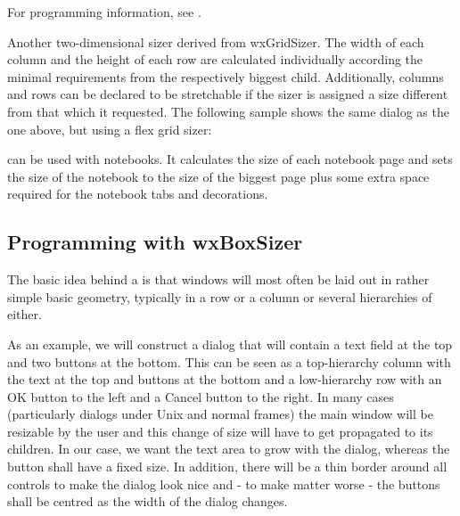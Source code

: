 For programming information, see .


Another two-dimensional sizer derived from
wxGridSizer. The width of each column and the height of each row
are calculated individually according the minimal requirements
from the respectively biggest child. Additionally, columns and
rows can be declared to be stretchable if the sizer is assigned
a size different from that which it requested. The following sample shows
the same dialog as the one above, but using a flex grid sizer:

\begin{center}
\end{center}


 can be used
with notebooks. It calculates the size of each
notebook page and sets the size of the notebook to the size
of the biggest page plus some extra space required for the
notebook tabs and decorations.

\subsection{Programming with wxBoxSizer}\label{boxsizerprogramming}

The basic idea behind a  is that windows will most often be laid out in rather
simple basic geometry, typically in a row or a column or several hierarchies of either.

As an example, we will construct a dialog that will contain a text field at the top and
two buttons at the bottom. This can be seen as a top-hierarchy column with the text at
the top and buttons at the bottom and a low-hierarchy row with an OK button to the left
and a Cancel button to the right. In many cases (particularly dialogs under Unix and
normal frames) the main window will be resizable by the user and this change of size
will have to get propagated to its children. In our case, we want the text area to grow
with the dialog, whereas the button shall have a fixed size. In addition, there will be
a thin border around all controls to make the dialog look nice and - to make matter worse -
the buttons shall be centred as the width of the dialog changes.

